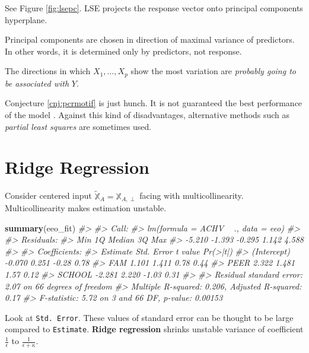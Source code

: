 \documentclass[]{book}
\newenvironment{Shaded}{\begin{snugshade}}{\end{snugshade}}
\newcommand{\CommentTok}[1]{\textcolor[rgb]{0.56,0.35,0.01}{\textit{#1}}}
\newcommand{\KeywordTok}[1]{\textcolor[rgb]{0.13,0.29,0.53}{\textbf{#1}}}
\newcommand{\NormalTok}[1]{#1}
\theoremstyle{definition}
\theoremstyle{definition}
\theoremstyle{definition}
\theoremstyle{remark}
\let\BeginKnitrBlock\begin \let\EndKnitrBlock\end
\begin{document}
See Figure \ref{fig:lsepc}. LSE projects the response vector onto principal components hyperplane.

Principal components are chosen in direction of maximal variance of predictors. In other words, it is determined only by predictors, not response.

\BeginKnitrBlock{conjecture}[Key idea of PCR]
\protect\hypertarget{cnj:pcrmotif}{}{\label{cnj:pcrmotif} {} }The directions in which \(X_1, \ldots, X_p\) show the most variation are \textit{probably going to be associated with} \(Y\).
\EndKnitrBlock{conjecture}

Conjecture \ref{cnj:pcrmotif} is just hunch. It is not guaranteed the best performance of the model \citep{James:2013aa}. Against this kind of disadvantages, alternative methods such as \emph{partial least squares} are sometimes used.

\hypertarget{ridge-regression}{%
\section{Ridge Regression}\label{ridge-regression}}

Consider centered input \(\widetilde{\mathbb{X}}_A = \mathbb{X}_{A, \perp}\) facing with multicollinearity. Multicollinearity makes estimation unstable.

\begin{Shaded}
\begin{Highlighting}[]
\KeywordTok{summary}\NormalTok{(eeo_fit)}
\CommentTok{#> }
\CommentTok{#> Call:}
\CommentTok{#> lm(formula = ACHV ~ ., data = eeo)}
\CommentTok{#> }
\CommentTok{#> Residuals:}
\CommentTok{#>    Min     1Q Median     3Q    Max }
\CommentTok{#> -5.210 -1.393 -0.295  1.142  4.588 }
\CommentTok{#> }
\CommentTok{#> Coefficients:}
\CommentTok{#>             Estimate Std. Error t value Pr(>|t|)}
\CommentTok{#> (Intercept)   -0.070      0.251   -0.28     0.78}
\CommentTok{#> FAM            1.101      1.411    0.78     0.44}
\CommentTok{#> PEER           2.322      1.481    1.57     0.12}
\CommentTok{#> SCHOOL        -2.281      2.220   -1.03     0.31}
\CommentTok{#> }
\CommentTok{#> Residual standard error: 2.07 on 66 degrees of freedom}
\CommentTok{#> Multiple R-squared:  0.206,  Adjusted R-squared:  0.17 }
\CommentTok{#> F-statistic: 5.72 on 3 and 66 DF,  p-value: 0.00153}
\end{Highlighting}
\end{Shaded}

Look at \texttt{Std.\ Error}. These values of standard error can be thought to be large compared to \texttt{Estimate}. \textbf{Ridge regression} shrinks unstable variance of coefficient \(\frac{1}{\epsilon}\) to \(\frac{1}{\epsilon + \kappa}\).
\end{document}

